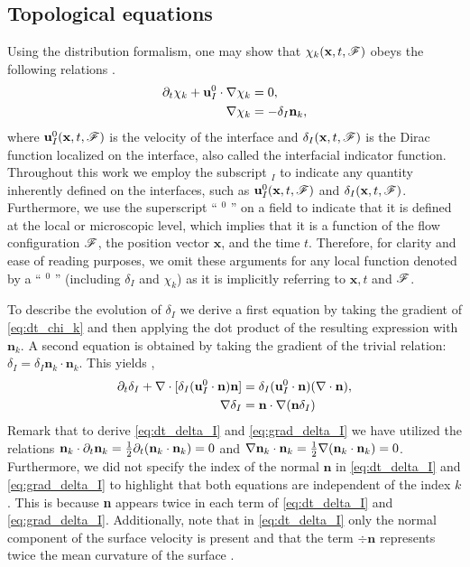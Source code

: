 \subsection{Topological equations}
Using the distribution formalism, one may show that $\chi_k(\textbf{x},t,\mathscr{F})$ obeys the following relations \citep{drew1983mathematical,orlando2023evolution}. 
\begin{align}
    \partial_t \chi_k
    + \textbf{u}_I^0 \cdot \mathbf{\nabla} \chi_k
    &= 0,
    \label{eq:dt_chi_k}\\
    \label{eq:grad_chi_k}
    \mathbf{\nabla} \chi_k
    &= - \delta_I \textbf{n}_k, 
\end{align}
where $\textbf{u}^0_I(\textbf{x},t,\mathscr{F})$ is the velocity of the interface and $\delta_I(\textbf{x},t,\mathscr{F})$ is the Dirac function localized on the interface, also called the interfacial indicator function.
Throughout this work we employ the subscript $_I$ to indicate any quantity inherently defined on the interfaces, such as $\textbf{u}_I^0(\textbf{x},t,\mathscr{F})$ and $\delta_I(\textbf{x},t,\mathscr{F})$. 
Furthermore, we use the superscript `` $^0$ '' on a field to indicate that it is defined at the local or microscopic level, which implies that it is a function of the flow configuration $\mathscr{F}$, the position vector $\textbf{x}$, and the time $t$. 
Therefore, for clarity and ease of reading purposes, we omit these arguments for any local function denoted by a `` $^0$ '' (including $\delta_I$ and $\chi_k$) as it is implicitly referring to $\textbf{x},t$ and $\mathscr{F}$.

To describe the evolution of $\delta_I$ we derive a first equation by taking the gradient of \ref{eq:dt_chi_k} and then applying the dot product of the resulting expression with $\textbf{n}_k$.
A second equation is obtained by taking the gradient of the trivial relation: $\delta_I = \delta_I \textbf{n}_k\cdot \textbf{n}_k$.
This yields \citep{morel2007surface,orlando2023evolution}, 
\begin{align}
    \partial_t \delta_I
    + \mathbf{\nabla}\cdot [\delta_I (\textbf{u}_I^0\cdot \textbf{n}) \textbf{n}]
    &= \delta_I (\textbf{u}_I^0 \cdot \textbf{n})(\mathbf{\nabla}\cdot\textbf{n}),
    \label{eq:dt_delta_I}\\
    \mathbf{\nabla}\delta_I 
    &= \textbf{n}\cdot  \mathbf{\nabla} (\textbf{n} \delta_I) 
    \label{eq:grad_delta_I}
\end{align} 
Remark that to derive \ref{eq:dt_delta_I} and \ref{eq:grad_delta_I} we have utilized the relations $\textbf{n}_k\cdot \partial_t\textbf{n}_k= \frac{1}{2}\partial_t(\textbf{n}_k\cdot \textbf{n}_k) = 0$ and $\mathbf{\nabla} \textbf{n}_k \cdot \textbf{n}_k =\frac{1}{2} \mathbf{\nabla}(\textbf{n}_k\cdot \textbf{n}_k) = 0$. 
Furthermore, we did not specify the index of the normal $\textbf{n}$ in \ref{eq:dt_delta_I} and \ref{eq:grad_delta_I} to highlight that both equations are independent of the index $k$. 
This is because \textbf{n} appears twice in each term of \ref{eq:dt_delta_I} and \ref{eq:grad_delta_I}.
Additionally, note that in \ref{eq:dt_delta_I} only the normal component of the surface velocity is present and that the term $\div \textbf{n}$ represents twice the mean curvature of the surface \citep{aris2012vectors}. 


